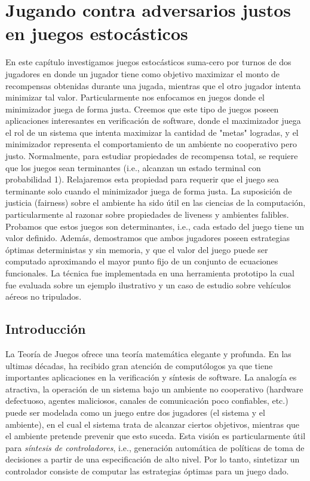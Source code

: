\chapter{Jugando contra adversarios justos en juegos estocásticos}
\label{cap:fairAdversaries}

En este capítulo investigamos juegos estocásticos suma-cero por turnos de dos jugadores en donde un jugador tiene como objetivo maximizar el monto de recompensas obtenidas durante una jugada, mientras que el otro jugador intenta minimizar tal valor. Particularmente nos enfocamos en juegos donde el minimizador juega de forma justa. Creemos que este tipo de juegos poseen aplicaciones interesantes en verificación de software, donde el maximizador juega el rol de un sistema que intenta maximizar la cantidad de "metas" logradas, y el minimizador representa el comportamiento de un ambiente no cooperativo pero justo.
Normalmente, para estudiar propiedades de recompensa total, se requiere que los juegos sean terminantes (i.e., alcanzan un estado terminal con probabilidad 1). 
Relajaremos esta propiedad para requerir que el juego sea terminante solo cuando el minimizador juega de forma justa. La suposición de justicia (fairness) sobre el ambiente ha sido útil en las ciencias de la computación, particularmente al razonar sobre propiedades de liveness y ambientes falibles.
Probamos que estos juegos son determinantes, i.e., cada estado del juego tiene un valor definido. Además, demostramos que ambos jugadores poseen estrategias óptimas deterministas y sin memoria, y que el valor del juego puede ser computado aproximando el mayor punto fijo de un conjunto de ecuaciones funcionales. La técnica fue implementada en una herramienta prototipo la cual fue evaluada sobre un ejemplo ilustrativo y un caso de estudio sobre vehículos aéreos no tripulados.

\section{Introducción} \label{sec:intro}
	La Teoría de Juegos \cite{MorgensternNeuman42}  ofrece una teoría matemática elegante y profunda. 
	En las ultimas décadas, ha recibido gran atención de computólogos ya que tiene importantes aplicaciones en la verificación y síntesis de software. 
	La analogía es atractiva, la operación de un sistema bajo un ambiente no cooperativo (hardware defectuoso, agentes maliciosos, canales de comunicación poco confiables, etc.) puede ser modelada como un juego entre dos jugadores (el sistema y el ambiente), en el cual el sistema trata de alcanzar ciertos objetivos, mientras que el ambiente pretende prevenir que esto suceda. 
	Esta visión es particularmente útil para \emph{síntesis de controladores}, i.e., generación automática de políticas de toma de decisiones a partir de una especificación de alto nivel. 
	Por lo tanto, sintetizar un controlador consiste de computar las estrategias óptimas para un juego dado.
		
